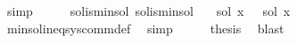 \begin{isabellebody}
\ simp\isanewline
\ \ \isamarkupfalse%
\ \isamarkupfalse%
\ sol{}{\isacharunderscore}{\kern0pt}is{\isacharunderscore}{\kern0pt}min{\isacharunderscore}{\kern0pt}sol\ sol{}{\isacharunderscore}{\kern0pt}is{\isacharunderscore}{\kern0pt}min{\isacharunderscore}{\kern0pt}sol\ \isamarkupfalse%
\ {\isachardoublequoteopen}{\isasymPsi}\ {\isacharparenleft}{\kern0pt}sol{}\ x{\isacharparenright}{\kern0pt}\ {\isasymsubseteq}\ {\isasymPsi}\ {\isacharparenleft}{\kern0pt}sol{}\ x{\isacharparenright}{\kern0pt}{\isachardoublequoteclose}\isanewline
\ \ \ \ \isamarkupfalse%
\ min{\isacharunderscore}{\kern0pt}sol{\isacharunderscore}{\kern0pt}ineq{\isacharunderscore}{\kern0pt}sys{\isacharunderscore}{\kern0pt}comm{\isacharunderscore}{\kern0pt}def\ \isamarkupfalse%
\ simp\isanewline
\ \ \isamarkupfalse%
\ \isamarkupfalse%
\ {\isacharquery}{\kern0pt}thesis\ \isamarkupfalse%
\ blast\isanewline
{}\isamarkupfalse%
%
\endisatagproof
{\isafoldproof}%
%
\isadelimproof
\isanewline
%
\endisadelimproof
%
\isadelimtheory
\isanewline
%
\endisadelimtheory
%
\isatagtheory
{}\isamarkupfalse%
%
\endisatagtheory
{\isafoldtheory}%
%
\isadelimtheory
%
\endisadelimtheory
%
\end{isabellebody}%
\endinput
